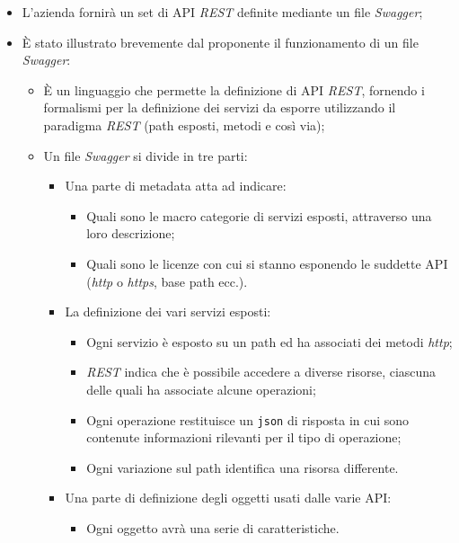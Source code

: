 \documentclass[11pt]{article}
\begin{document}
\begin{enumerate}
			\begin{itemize}
				\item L'azienda fornirà un set di API \textit{REST} definite mediante un file \textit{Swagger};
				\item È stato illustrato brevemente dal proponente il funzionamento di un file \textit{Swagger}:
				\begin{itemize}
					\item È un linguaggio che permette la definizione di API \textit{REST}, fornendo i formalismi per la
					definizione	dei servizi da esporre utilizzando il paradigma \textit{REST} (path esposti, metodi e così via);
					\item Un file \textit{Swagger} si divide in tre parti: 
					\begin{itemize}
						\item Una parte di metadata atta ad indicare:
						\begin{itemize}
							\item Quali sono le macro categorie di servizi esposti, attraverso una loro descrizione;
							\item Quali sono le licenze con cui si stanno esponendo le suddette API
							(\textit{http} o \textit{https}, base path ecc.).
						\end{itemize}
						\item La definizione dei vari servizi esposti:
						\begin{itemize}
							\item Ogni servizio è esposto su un path ed ha associati dei metodi \textit{http};
							\item \textit{REST} indica che è possibile accedere a diverse risorse, ciascuna delle quali ha
							associate alcune operazioni;
							\item  Ogni operazione restituisce un \texttt{json} di risposta in cui sono contenute informazioni
							rilevanti per il tipo di operazione;
							\item Ogni variazione sul path identifica una risorsa differente.
						\end{itemize}												
						\item Una parte di definizione degli oggetti usati dalle varie API:
						\begin{itemize}
							\item Ogni oggetto avrà una serie di caratteristiche.
						\end{itemize}												
					\end{itemize} 
				\end{itemize}
			\end{itemize}
			

\end{enumerate}
\end{document}
